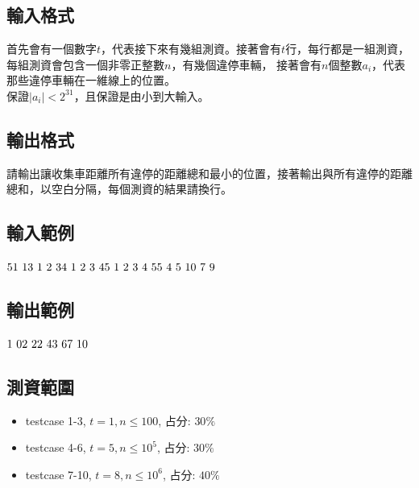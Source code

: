 \documentclass{article}
\begin{document}
\begin{CJK*}{UTF8}{bsmi}
\subsection*{輸入格式}
首先會有一個數字$t$，代表接下來有幾組測資。接著會有$t$行，每行都是一組測資，每組測資會包含一個非零正整數$n$，有幾個違停車輛，
接著會有$n$個整數$a_i$，代表那些違停車輛在一維線上的位置。\\
保證$\lvert a_i\rvert <2^{31}$，且保證是由小到大輸入。

\subsection*{輸出格式}
請輸出讓收集車距離所有違停的距離總和最小的位置，接著輸出與所有違停的距離總和，以空白分隔，每個測資的結果請換行。

\subsection*{輸入範例}
$5\\1\ 1\\3\ 1\ 2\ 3\\4\ 1\ 2\ 3\ 4\\5\ 1\ 2\ 3\ 4\ 5\\5\ 4\ 5\ 10\ 7\ 9$

\subsection*{輸出範例}
$1\ 0\\2\ 2\\2\ 4\\3\ 6\\7\ 10$

\subsection*{測資範圍}
\begin{itemize}
    \item testcase 1-3, $t=1,n\leq100$, 占分: $30\%$
    \item testcase 4-6, $t=5,n\leq10^5$, 占分: $30\%$
    \item testcase 7-10, $t=8, n\leq10^6$, 占分: $40\%$
\end{itemize}

\end{CJK*}
\end{document}
